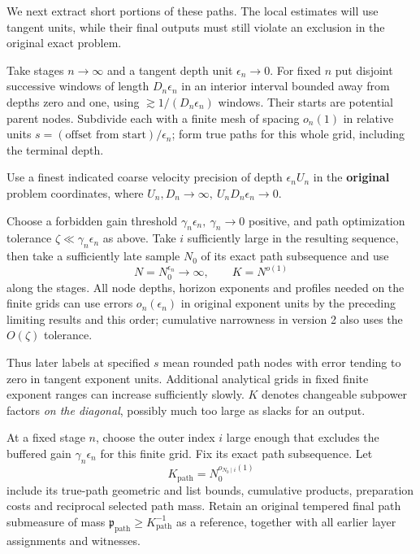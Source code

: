 We next extract short portions of these paths. The local estimates
will use tangent units, while their final outputs must still violate
an exclusion in the original exact problem.

Take stages \(n\to\infty\) and a tangent depth unit \(\epsilon_n\to0\). For fixed \(n\) put disjoint successive windows of length \(D_n\epsilon_n\) in an interior interval bounded away from depths zero and one, using \(\gtrsim1/(D_n\epsilon_n)\) windows. Their starts are potential parent nodes. Subdivide each with a finite mesh of spacing \(o_n(1)\) in relative units \(s=(\text{offset from start})/\epsilon_n\); form true paths for this whole grid, including the terminal depth.

Use a finest indicated coarse velocity precision of depth \(\epsilon_n U_n\) in the \textbf{original} problem coordinates, where \(U_n,D_n\to\infty,\ U_nD_n\epsilon_n\to0\).

Choose a forbidden gain threshold \(\gamma_n\epsilon_n,\ \gamma_n\to0\) positive, and path optimization tolerance \(\zeta\ll\gamma_n\epsilon_n\) as above. Take \(i\) sufficiently large in the resulting sequence, then take a sufficiently late sample \(N_0\) of its exact path subsequence and use
\begin{equation}
N=N_0^{\epsilon_n}\to\infty,\qquad K=N^{o(1)}
\end{equation}
along the stages. All node depths, horizon exponents and profiles needed on the finite grids can use errors \(o_n(\epsilon_n)\) in original exponent units by the preceding limiting results and this order; cumulative narrowness in version 2 also uses the \(O(\zeta)\) tolerance.

Thus later labels at specified \(s\) mean rounded path nodes with error tending to zero in tangent exponent units. Additional analytical grids in fixed finite exponent ranges can increase sufficiently slowly. \(K\) denotes changeable subpower factors \emph{on the diagonal}, possibly much too large as slacks for an output.


At a fixed stage \(n\), choose the outer index \(i\) large enough that
 excludes the buffered gain
\(\gamma_n\epsilon_n\) for this finite grid.  Fix its exact path
subsequence.  Let
\begin{equation}
K_{\mathrm{path}}=N_0^{o_{N_0\mid i}(1)}
\end{equation}
include its true-path geometric and list bounds, cumulative products,
preparation costs and reciprocal selected path mass.  Retain an
original tempered final path submeasure of mass
\(\mathfrak p_{\mathrm{path}}\ge K_{\mathrm{path}}^{-1}\) as a reference,
together with all earlier layer assignments and witnesses.

